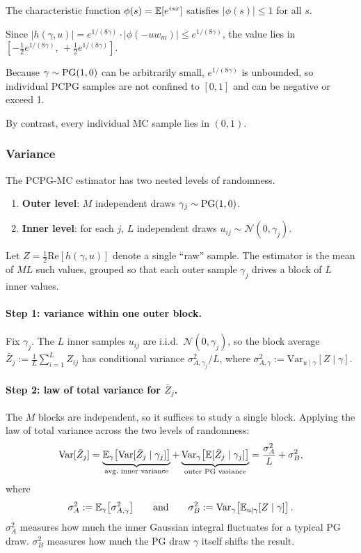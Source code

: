 The characteristic function $\phi(s) = \mathbb{E}[e^{isx}]$ satisfies $|\phi(s)| \leq 1$
for all $s$.

Since $|h(\gamma,u)| = e^{1/(8\gamma)} \cdot |\phi(-uw_m)| \leq e^{1/(8\gamma)}$,
the value lies in $\left[-\tfrac{1}{2}e^{1/(8\gamma)},\, +\tfrac{1}{2}e^{1/(8\gamma)}\right]$.

Because $\gamma \sim \mathrm{PG}(1,0)$ can be arbitrarily small, $e^{1/(8\gamma)}$ is
unbounded, so individual PCPG samples are not confined to $[0,1]$ and can be
negative or exceed 1.

By contrast, every individual MC sample lies in $(0,1)$.

\subsubsection{Variance}

The PCPG-MC estimator has two nested levels of randomness.
\begin{enumerate}
  \item \textbf{Outer level}: $M$ independent draws $\gamma_j \sim \mathrm{PG}(1,0)$.
  \item \textbf{Inner level}: for each $j$, $L$ independent draws $u_{ij} \sim \mathcal{N}(0, \gamma_j)$.
\end{enumerate}
Let $Z = \tfrac{1}{2}\mathrm{Re}[h(\gamma, u)]$ denote a single ``raw'' sample.
The estimator is the mean of $ML$ such values, grouped so that each outer sample
$\gamma_j$ drives a block of $L$ inner values.

\paragraph{Step 1: variance within one outer block.}
Fix $\gamma_j$.  The $L$ inner samples $u_{ij}$ are i.i.d.\ $\mathcal{N}(0,\gamma_j)$, so the
block average $\bar Z_j := \frac{1}{L}\sum_{i=1}^{L} Z_{ij}$
has conditional variance $\sigma^2_{A,\gamma_j} / L$, where
$\sigma^2_{A,\gamma} := \mathrm{Var}_{u \mid \gamma}[Z \mid \gamma]$.

\paragraph{Step 2: law of total variance for $\bar Z_j$.}
The $M$ blocks are independent, so it suffices to study a single block.
Applying the law of total variance across the two levels of randomness:
\[
  \mathrm{Var}[\bar Z_j]
  = \underbrace{\mathbb{E}_\gamma\!\left[\mathrm{Var}[\bar Z_j \mid \gamma_j]\right]}_{\text{avg.\ inner variance}}
  +\underbrace{\mathrm{Var}_\gamma\!\left[\mathbb{E}[\bar Z_j \mid \gamma_j]\right]}_{\text{outer PG variance}}
  = \frac{\sigma^2_A}{L} + \sigma^2_B,
\]
where
\[
  \sigma^2_A := \mathbb{E}_\gamma\bigl[\sigma^2_{A,\gamma}\bigr]
  \qquad\text{and}\qquad
  \sigma^2_B := \mathrm{Var}_\gamma\!\left[\mathbb{E}_{u \mid \gamma}[Z \mid \gamma]\right].
\]
$\sigma^2_A$ measures how much the inner Gaussian integral fluctuates for a typical PG draw.
$\sigma^2_B$ measures how much the PG draw $\gamma$ itself shifts the result.

